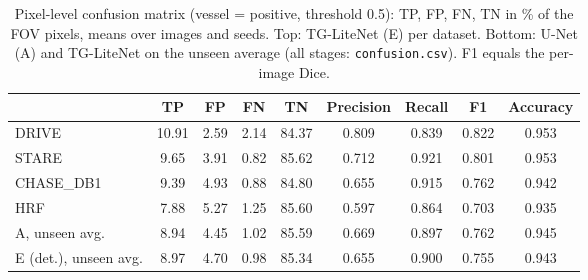 \begin{table}[t]
\centering
\caption{Pixel-level confusion matrix (vessel = positive, threshold 0.5): TP, FP, FN, TN in \% of the FOV pixels, means over images and seeds. Top: TG-LiteNet (E) per dataset. Bottom: U-Net (A) and TG-LiteNet on the unseen average (all stages: \texttt{confusion.csv}). F1 equals the per-image Dice.}
\label{tab:confusion}
\footnotesize
\setlength{\tabcolsep}{3pt}
\begin{adjustbox}{max width=\columnwidth}\begin{tabular}{l cccc cccc}
\toprule
 & TP & FP & FN & TN & Precision & Recall & F1 & Accuracy \\
\midrule
DRIVE & 10.91 & 2.59 & 2.14 & 84.37 & 0.809 & 0.839 & 0.822 & 0.953 \\
STARE & 9.65 & 3.91 & 0.82 & 85.62 & 0.712 & 0.921 & 0.801 & 0.953 \\
CHASE\_DB1 & 9.39 & 4.93 & 0.88 & 84.80 & 0.655 & 0.915 & 0.762 & 0.942 \\
HRF & 7.88 & 5.27 & 1.25 & 85.60 & 0.597 & 0.864 & 0.703 & 0.935 \\
\midrule
A, unseen avg. & 8.94 & 4.45 & 1.02 & 85.59 & 0.669 & 0.897 & 0.762 & 0.945 \\
E (det.), unseen avg. & 8.97 & 4.70 & 0.98 & 85.34 & 0.655 & 0.900 & 0.755 & 0.943 \\
\bottomrule
\end{tabular}\end{adjustbox}
\end{table}